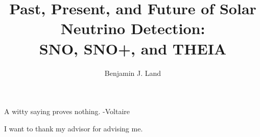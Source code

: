 \documentclass[12pt,letterpaper,oldfontcommands]{ucbthesis}
\begin{document}
\title{Past, Present, and Future of Solar Neutrino Detection:\\SNO, SNO+, and T\textsc{HEIA}}
\author{Benjamin J. Land}
\maketitle
\approvalpage
\copyrightpage



\begin{frontmatter}

\begin{dedication}
\null\vfil
\begin{center}
A witty saying proves nothing. -Voltaire
\end{center}
\vfil\null
\end{dedication}

\tableofcontents
\clearpage
\listoffigures
\clearpage
\listoftables

\begin{acknowledgements}
I want to thank my advisor for advising me.
\end{acknowledgements}

\end{frontmatter}

\pagestyle{headings}







\printbibliography
\end{document}
